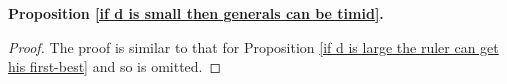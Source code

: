 \documentclass[11pt,]{article}
\begin{document}
\noindent\textbf{Proposition \ref{if d is small then generals can be timid}.}
\begin{proof}The proof is similar to that for Proposition \ref{if d is large the ruler can get his first-best} and so is omitted.
\end{proof}
\end{document}
